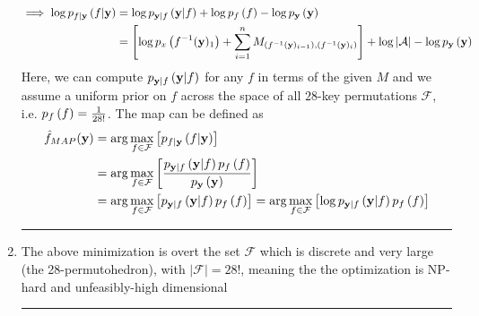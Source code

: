 \documentclass[12pt]{report}
\begin{document}
\begin{enumerate}[a]
\begin{align*}
	\implies  \log p_{f\vert \mathbf{y}}\left( f \vert \mathbf{y} \right) &= \log p_{\mathbf{y}\vert f}\left( \mathbf{y} \vert f \right) + \log p_{{f}}\left( f \right)  - \log p_{{\mathbf{y}}}\left( \mathbf{y} \right)\\
	&=  \left[\log p_{{x}}\left( f^{-1}(\mathbf{y})_1 \right) + \sum_{i=1}^{n} M_{(f^{-1}(\mathbf{y})_{i-1}),(f^{-1}(\mathbf{y})_{i})}\right] + \log \left\vert \mathcal{A}\right\vert - \log p_{{\mathbf{y}}}\left( \mathbf{y} \right)
	\end{align*}
	Here, we can compute $p_{\mathbf{y}\vert f}\left( \mathbf{y} \vert f \right)$ for any $f$ in terms of the given $M$ and we assume a uniform prior on $f$ across the space of all $28$-key permutations $\mathcal{F}$, i.e. $p_{{f}}\left( f \right)=\frac{1}{28!}$.
	The map can be defined as 
	\begin{align*}
		\hat{f}_{MAP}(\mathbf{y}) &= \arg\max_{f\in\mathcal{F}}\left[p_{f\vert \mathbf{y}}\left( f \vert \mathbf{y} \right)\right]\\
		&=\arg\max_{f\in\mathcal{F}}\left[\frac{	p_{\mathbf{y}\vert f}\left( \mathbf{y} \vert f \right) p_{{f}}\left( f \right)}{p_{{\mathbf{y}}}\left( \mathbf{y} \right)}\right]\\
		&= \arg\max_{f\in\mathcal{F}}\left[p_{\mathbf{y}\vert f}\left( \mathbf{y} \vert f \right)p_{{f}}\left( f \right)\right] =\arg\max_{f\in\mathcal{F}}\left[\log p_{\mathbf{y}\vert f}\left( \mathbf{y} \vert f \right)p_{{f}}\left( f \right)\right]\\
    \end{align*}
    \hrule
  
    \item The  above minimization is overt the set $\mathcal{F}$ which is discrete and very large (the 28-permutohedron), with $\left\vert\mathcal{F} \right\vert =28!$, meaning the the optimization is NP-hard and unfeasibly-high dimensional
    \hrule
	\end{enumerate}
\newpage
\end{document}
